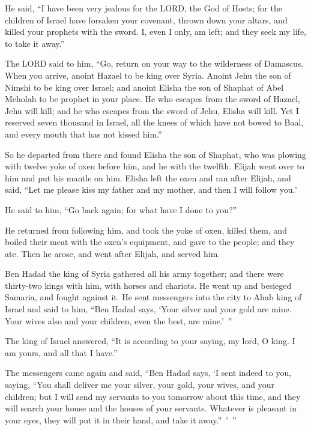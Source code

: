 \myverse{}He said, “I have been very jealous for the LORD, the God of
Hosts; for the children of Israel have forsaken your covenant, thrown down your altars, and killed your
prophets with the sword. I, even I only, am left; and they seek my life, to take it away.”

\myverse{}The LORD said to him, “Go, return on your way to the wilderness
of Damascus. When you arrive, anoint Hazael to be king over Syria.
\myverse{}Anoint Jehu the son of Nimshi to be king over Israel; and anoint Elisha the
son of Shaphat of Abel Meholah to be prophet in your place.
\myverse{}He who escapes from the sword of Hazael, Jehu will kill; and he who escapes
from the sword of Jehu, Elisha will kill.
\myverse{}Yet I reserved seven thousand in Israel, all the knees of which have not
bowed to Baal, and every mouth that has not kissed him.”

\myverse{}So he departed from there and found Elisha the son of Shaphat,
who was plowing with twelve yoke of oxen before him, and he with the twelfth. Elijah went over to him
and put his mantle on him.
\myverse{}Elisha left the oxen and ran after Elijah, and said, “Let me please kiss
my father and my mother, and then I will follow you.”

He said to him, “Go back again; for what have I done to you?”

\myverse{}He returned from following him, and took the yoke of oxen, killed
them, and boiled their meat with the oxen’s equipment, and gave to the people; and they ate. Then he arose,
and went after Elijah, and served him.


\mychapter{} \myverse*{}Ben Hadad the king of Syria gathered all his army together; and
there were thirty-two kings with him, with horses and chariots. He went up and besieged Samaria, and fought
against it.
\myverse{}He sent messengers into the city to Ahab king of Israel and said to him, “Ben
Hadad says,
\myverse{}‘Your silver and your gold are mine. Your wives also and your children, even
the best, are mine.’ ”

\myverse{}The king of Israel answered, “It is according to your saying,
my lord, O king. I am yours, and all that I have.”

\myverse{}The messengers came again and said, “Ben Hadad says, ‘I sent indeed
to you, saying, “You shall deliver me your silver, your gold, your wives, and your children;
\myverse{}but I will send my servants to you tomorrow about this time, and they will
search your house and the houses of your servants. Whatever is pleasant in your eyes, they will put it
in their hand, and take it away.” ’ ”

